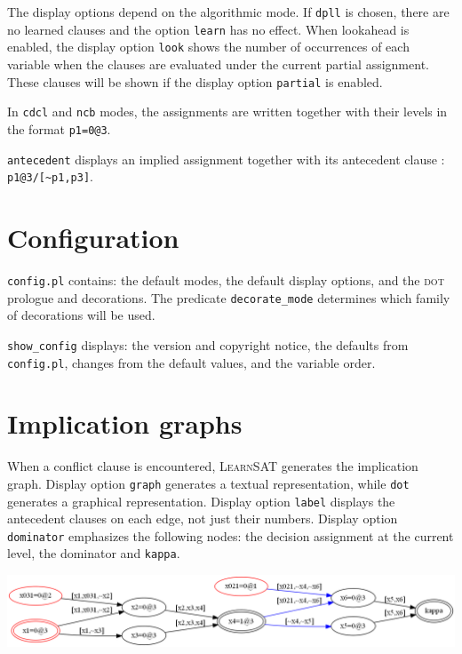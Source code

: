 \documentclass[11pt]{article}
\newcommand*{\p}[1]{\textup{\texttt{#1}}}
\newcommand*{\ls}{\textsc{LearnSAT}}
\newcommand*{\dt}{\textsc{dot}}
\begin{document}
The display options depend on the algorithmic mode. If \p{dpll} is chosen, there are no learned clauses and the option \p{learn} has no effect. When lookahead is enabled, the display option \p{look} shows the number of occurrences of each variable when the clauses are evaluated under the current partial assignment. These clauses will be shown if the display option \p{partial} is enabled.

In \p{cdcl} and \p{ncb} modes, the assignments are written together with their levels in the format \p{p1=0@3}.

\p{antecedent} displays an implied assignment together with its
antecedent clause : \verb+p1@3/[~p1,p3]+.


\section{Configuration}

\p{config.pl} contains: the default modes, the default display options, and the \dt{} prologue and decorations. The predicate \p{decorate\_mode} determines which family of decorations will be used.

\p{show\_config} displays: the version and copyright notice, the
defaults from \p{config.pl}, changes from the default values, and the
variable order.


\section{Implication graphs}\label{s.impl}

When a conflict clause is encountered, \ls{} generates the implication
graph. Display option \p{graph} generates a textual representation,
while \p{dot} generates a graphical representation. Display option
\p{label} displays the antecedent clauses on each edge, not just their
numbers. Display option \p{dominator} emphasizes the following nodes:
the decision assignment at the current level, the dominator and
\p{kappa}.

\begin{center}
\includegraphics[keepaspectratio=true,width=\textwidth]{dom-color}
\end{center}
\end{document}
